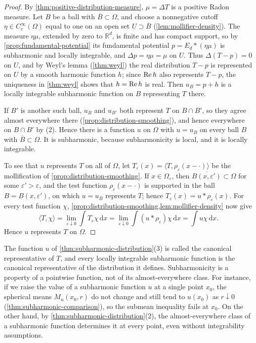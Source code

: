 \begin{proof}
By \cref{thm:positive-distribution-measure}, $\mu=\Delta T$ is a positive Radon measure. Let $B$ be a ball with $\overline B\subset\Omega$, and choose a nonnegative cutoff $\eta\in C_c^\infty(\Omega)$ equal to one on an open set $U\supset\overline B$ (\cref{lem:mollifier-density}). The measure $\eta\mu$, extended by zero to $\mathbb R^d$, is finite and has compact support, so by \cref{prop:fundamental-potential} its fundamental potential $p=E_d*(\eta\mu)$ is subharmonic and locally integrable, and $\Delta p=\eta\mu=\mu$ on $U$. Thus $\Delta(T-p)=0$ on $U$, and by Weyl's lemma (\cref{thm:weyl}) the real distribution $T-p$ is represented on $U$ by a smooth harmonic function $h$; since $\operatorname{Re} h$ also represents $T-p$, the uniqueness in \cref{thm:weyl} shows that $h=\operatorname{Re} h$ is real. Then $u_B=p+h$ is a locally integrable subharmonic function on $B$ representing $T$ there.

If $B'$ is another such ball, $u_B$ and $u_{B'}$ both represent $T$ on $B\cap B'$, so they agree almost everywhere there (\cref{prop:distribution-smoothing}), and hence everywhere on $B\cap B'$ by (2). Hence there is a function $u$ on $\Omega$ with $u=u_B$ on every ball $B$ with $\overline B\subset\Omega$. It is subharmonic, because subharmonicity is local, and it is locally integrable.

To see that $u$ represents $T$ on all of $\Omega$, let $T_\varepsilon(x)=\langle T,\rho_\varepsilon(x-\cdot)\rangle$ be the mollification of \cref{prop:distribution-smoothing}. If $x\in\Omega_\varepsilon$, then $\overline{B(x,\varepsilon')}\subset\Omega$ for some $\varepsilon'>\varepsilon$, and the test function $\rho_\varepsilon(x-\cdot)$ is supported in the ball $B=B(x,\varepsilon')$, on which $u=u_B$ represents $T$; hence $T_\varepsilon(x)=u*\rho_\varepsilon(x)$. For every test function $\chi$, \cref{prop:distribution-smoothing,lem:mollifier-density} now give
\[
 \langle T,\chi\rangle=\lim_{\varepsilon\downarrow0}\int T_\varepsilon\chi\,\mathrm d x=\lim_{\varepsilon\downarrow0}\int(u*\rho_\varepsilon)\chi\,\mathrm d x=\int u\chi\,\mathrm d x.
\]
Hence $u$ represents $T$ on $\Omega$.
\end{proof}

The function $u$ of \cref{thm:subharmonic-distribution}(3) is called the canonical representative of $T$, and every locally integrable subharmonic function is the canonical representative of the distribution it defines. Subharmonicity is a property of a pointwise function, not of its almost-everywhere class. For instance, if we raise the value of a subharmonic function $u$ at a single point $x_0$, the spherical means $M_u(x_0,r)$ do not change and still tend to $u(x_0)$ as $r\downarrow0$ (\cref{thm:subharmonic-comparison}), so the submean inequality fails at $x_0$. On the other hand, by \cref{thm:subharmonic-distribution}(2), the almost-everywhere class of a subharmonic function determines it at every point, even without integrability assumptions.

